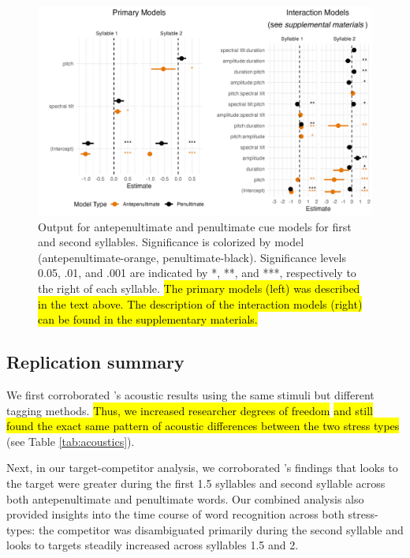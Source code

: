 \begin{figure}[H]
  \centering
    \includegraphics[width=1\linewidth]{visuals/combined_plot_o_n.jpeg} %

  \caption{Output for antepenultimate and penultimate cue models for first and second syllables. Significance is colorized by model (antepenultimate-orange, penultimate-black). Significance levels 0.05, .01, and .001 are indicated by *, **, and ***, respectively to the right of each syllable. \hl{The primary models (left) was described in the text above. The description of the interaction models (right) can be found in the supplementary materials.}}
  \label{fig:analysis_3_plot}
\end{figure}

\subsection{Replication summary}
We first corroborated \cite{Sulpizio_McQueen_2012}'s acoustic results using the same stimuli but different tagging methods. \hl{Thus, we increased researcher degrees of freedom} \citep{Corretta2023} \hl{and still found the exact same pattern of acoustic differences between the two stress types} (see Table \ref{tab:acoustics}).

Next, in our target-competitor analysis, we corroborated \cite{Sulpizio_McQueen_2012}'s findings that looks to the target were greater during the first 1.5 syllables and second syllable across both antepenultimate and penultimate words. Our combined analysis also provided insights into the time course of word recognition across both stress-types: the competitor was disambiguated primarily during the second syllable and looks to targets steadily increased across syllables 1.5 and 2.

